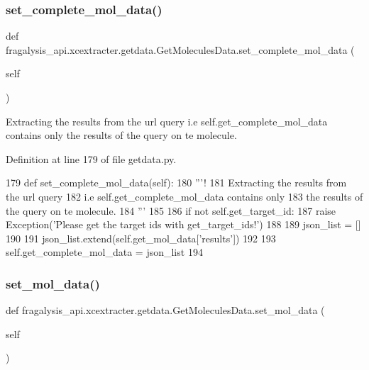 \subsubsection{\texorpdfstring{set\+\_\+complete\+\_\+mol\+\_\+data()}{set\_complete\_mol\_data()}}
{\footnotesize\ttfamily def fragalysis\+\_\+api.\+xcextracter.\+getdata.\+Get\+Molecules\+Data.\+set\+\_\+complete\+\_\+mol\+\_\+data (\begin{DoxyParamCaption}\item[{}]{self }\end{DoxyParamCaption})}



Extracting the results from the url query i.\+e self.\+get\+\_\+complete\+\_\+mol\+\_\+data contains only the results of the query on te molecule. 



Definition at line 179 of file getdata.\+py.


\begin{DoxyCode}
179     \textcolor{keyword}{def }set\_complete\_mol\_data(self):
180         \textcolor{stringliteral}{'''!}
181 \textcolor{stringliteral}{        Extracting the results from the url query}
182 \textcolor{stringliteral}{        i.e self.get\_complete\_mol\_data contains only}
183 \textcolor{stringliteral}{        the results of the query on te molecule.}
184 \textcolor{stringliteral}{        '''}
185 
186         \textcolor{keywordflow}{if} \textcolor{keywordflow}{not} self.get\_target\_id:
187             \textcolor{keywordflow}{raise} Exception(\textcolor{stringliteral}{'Please get the target ids with get\_target\_ids!'})
188 
189         json\_list = []
190 
191         json\_list.extend(self.get\_mol\_data[\textcolor{stringliteral}{'results'}])
192 
193         self.get\_complete\_mol\_data = json\_list
194         
\end{DoxyCode}
\mbox{\label{classfragalysis__api_1_1xcextracter_1_1getdata_1_1_get_molecules_data_ab1f0b5b8edbd496d800e08c7f8758a53}} 
\subsubsection{\texorpdfstring{set\+\_\+mol\+\_\+data()}{set\_mol\_data()}}
{\footnotesize\ttfamily def fragalysis\+\_\+api.\+xcextracter.\+getdata.\+Get\+Molecules\+Data.\+set\+\_\+mol\+\_\+data (\begin{DoxyParamCaption}\item[{}]{self }\end{DoxyParamCaption})}



